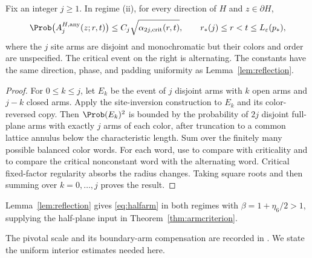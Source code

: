 \begin{corollary}\label{cor:generalreflection}
Fix an integer $j\ge1$.  In regime (ii), for every direction of $H$ and
$z\in\partial H$,
\[
 \Prob\bigl(A_j^{H,\mathrm{any}}(z;r,t)\bigr)
 \le C_j\sqrt{\alpha_{2j,\mathrm{crit}}(r,t)},
 \qquad r_*(j)\le r<t\le L_\varepsilon(p_*),
\]
where the $j$ site arms are disjoint and monochromatic but their colors
and order are unspecified.  The critical event on the right is alternating.
The constants have the same direction, phase, and padding uniformity as
Lemma~\ref{lem:reflection}.
\end{corollary}
\begin{proof}
For $0\le k\le j$, let $E_k$ be the event of $j$ disjoint arms with
$k$ open arms and $j-k$ closed arms.
Apply the site-inversion construction to $E_k$ and its color-reversed
copy. Then $\Prob(E_k)^2$ is bounded by the probability of $2j$
disjoint full-plane arms with exactly $j$ arms of each color, after
truncation to a common lattice annulus below the characteristic length.
Sum over the finitely many possible balanced color words.  For each word,
use \cite[Theorem~27]{Nolin} to compare with criticality and
\cite[Proposition~20]{Nolin} to compare the critical nonconstant word
with the alternating word.  Critical fixed-factor regularity absorbs
the radius changes.  Taking square roots and then summing over
$k=0,\ldots,j$ proves the result.
\end{proof}

Lemma~\ref{lem:reflection} gives \eqref{eq:halfarm} in both regimes with $\beta=1+\eta_6/2>1$, supplying the half-plane input in Theorem~\ref{thm:armcriterion}.

The pivotal scale and its boundary-arm compensation are recorded in \cite[Remark~36, equation~(7.17)]{Nolin}. We state the uniform interior estimates needed here.

